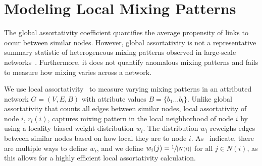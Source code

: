 \section{Modeling Local Mixing Patterns}
\label{subsec:LocalMixing}

The global assortativity coefficient quantifies
the average propensity of links to occur between similar nodes.
However, global assortativity is not a representative summary statistic of
heterogeneous mixing patterns observed in large-scale networks~\cite{peel2018multiscale}.
Furthermore, it does not quantify anomalous mixing patterns and fails to measure how mixing varies across a network.

We use local assortativity~\cite{peel2018multiscale} to measure varying
mixing patterns in an attributed network $G=(V,E,B)$ with attribute values $B=\{b_1...b_l\}$.
Unlike global assortativity that counts all edges between similar nodes, local assortativity
of node $i$, $r_l(i)$, captures mixing pattern in the local neighborhood of node
$i$ by using a locality biased weight distribution $w_i$. The distribution
$w_i$ reweighs edges between similar nodes based on how local they are to
node $i$. As~\citet{peel2018multiscale} indicate, there are multiple ways
to define $w_i$, and we define $w_i(j) = \sfrac{1}{|N(i)|}$ for all $j \in N(i)$, as this allows for a highly efficient local assortativity calculation.



